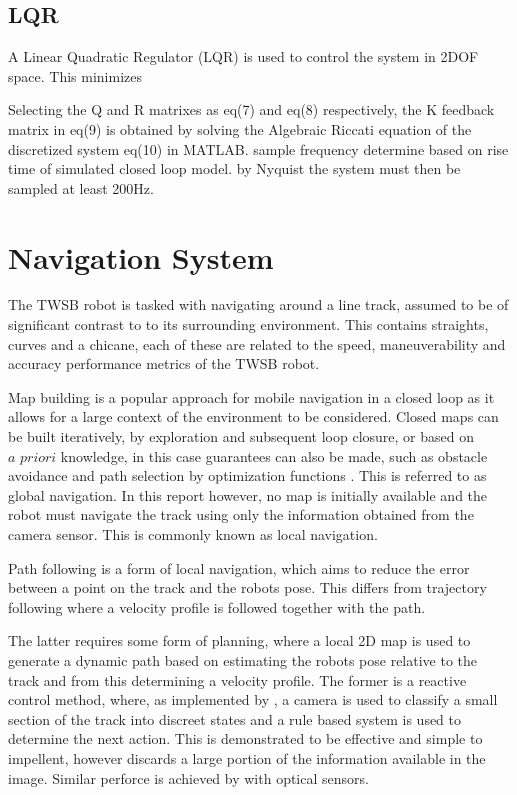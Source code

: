         \subsection{LQR}
        A Linear Quadratic Regulator (LQR) is used to control the system in 2DOF space.
        This minimizes 
        
       
        Selecting the Q and R matrixes as eq(7) and eq(8) respectively, 
        the K feedback matrix in eq(9) is obtained by solving the Algebraic Riccati
        equation of the discretized system eq(10) in MATLAB.
        sample frequency determine based on rise time of simulated closed loop model. 
        by Nyquist the system must then be sampled at least 200Hz. 

        \pagebreak{}
        \section{Navigation System}
        The TWSB robot is tasked with navigating around a line track, assumed to be of significant contrast to to its surrounding environment.
        This contains straights, curves and a chicane, each of these are related to the speed, maneuverability and accuracy
        performance metrics of the TWSB robot.

        Map building is a popular approach for mobile navigation in a closed loop as it allows for a large 
        context of the environment to be considered.  Closed maps can be built iteratively, by exploration 
        and subsequent loop closure, or based on $\textit{a priori}$ knowledge, in this case guarantees can also be made, 
        such as obstacle avoidance and path selection by optimization functions \cite{Macenski_2020}. This is referred to as global navigation.
        In this report however, no map is initially available and the robot must navigate the track using only
        the information obtained from the camera sensor. This is commonly known as local navigation.

        Path following is a form of local navigation, which aims to reduce the error between a point on the track 
        and the robots pose. This differs from trajectory following where a velocity profile is followed together with the path. 
              
        The latter requires some form of planning, where a local 2D map is used to generate a dynamic path based on estimating 
        the robots pose relative to the track and from this determining a velocity profile. The former is a reactive control
        method, where, as implemented by \cite{visionlinetwsb}, a camera is used to classify a small 
        section of the track into discreet states and a rule based system is used to determine the next action. This is demonstrated to be 
        effective and simple to impellent, however discards a large portion of the information available in the image. 
        Similar perforce is achieved by \cite{ghani2011two} with optical sensors. 



